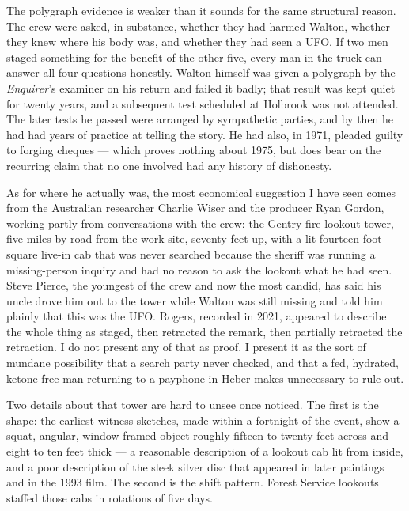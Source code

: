 The polygraph evidence is weaker than it sounds for the same structural reason. The crew were
asked, in substance, whether they had harmed Walton, whether they knew where his body was, and
whether they had seen a UFO. If two men staged something for the benefit of the other five,
every man in the truck can answer all four questions honestly. Walton himself was given a
polygraph by the \emph{Enquirer}'s examiner on his return and failed it badly; that result was
kept quiet for twenty years, and a subsequent test scheduled at Holbrook was not attended. The
later tests he passed were arranged by sympathetic parties, and by then he had had years of
practice at telling the story. He had also, in 1971, pleaded guilty to forging cheques --- which
proves nothing about 1975, but does bear on the recurring claim that no one involved had any
history of dishonesty.

As for where he actually was, the most economical suggestion I have seen comes from the
Australian researcher Charlie Wiser and the producer Ryan Gordon, working partly from
conversations with the crew: the Gentry fire lookout tower, five miles by road from the work
site, seventy feet up, with a lit fourteen-foot-square live-in cab that was never searched
because the sheriff was running a missing-person inquiry and had no reason to ask the lookout
what he had seen. Steve Pierce, the youngest of the crew and now the most candid, has said his
uncle drove him out to the tower while Walton was still missing and told him plainly that this
was the UFO. Rogers, recorded in 2021, appeared to describe the whole thing as staged, then
retracted the remark, then partially retracted the retraction. I do not present any of that as
proof. I present it as the sort of mundane possibility that a search party never checked, and
that a fed, hydrated, ketone-free man returning to a payphone in Heber makes unnecessary to
rule out.

\begin{funfact}
Two details about that tower are hard to unsee once noticed. The first is the shape: the
earliest witness sketches, made within a fortnight of the event, show a squat, angular,
window-framed object roughly fifteen to twenty feet across and eight to ten feet thick --- a
reasonable description of a lookout cab lit from inside, and a poor description of the sleek
silver disc that appeared in later paintings and in the 1993 film. The second is the shift
pattern. Forest Service lookouts staffed those cabs in rotations of five days.
\end{funfact}

